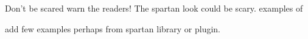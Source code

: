 Don't be scared warn the readers!
The spartan look could be scary.
examples of  

add few examples perhaps from spartan library or plugin. 

